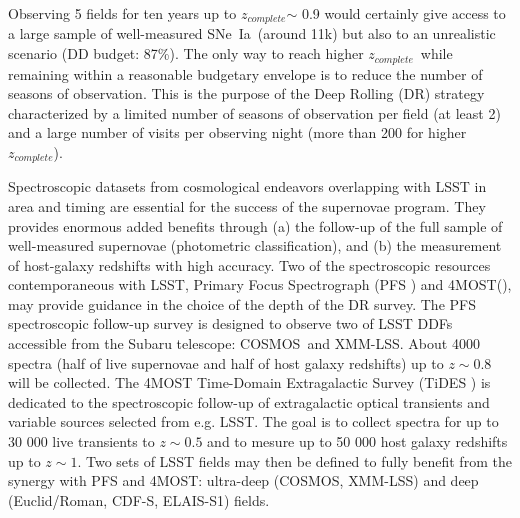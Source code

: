 \documentclass[skiphelvet,twocolumn]{aastex63}
\newcommand{\cosmos}{{COSMOS}}
\newcommand{\elais}{{ELAIS-S1}}
\newcommand{\xmm}{{XMM-LSS}}
\newcommand{\cdfs}{{CDF-S}}
\newcommand{\adfs}{{Euclid/Roman}}
\newcommand{\sne}{{SNe~Ia}}
\newcommand{\zcomp}{\mbox{$z_{complete}$}}
\begin{document}
Observing 5 fields for ten years up to \zcomp $\sim$ 0.9 would certainly give access to a large sample of well-measured \sne~(around 11k) but also to an unrealistic scenario (DD budget: 87\%). The only way to reach higher \zcomp~while remaining within a reasonable budgetary envelope is to reduce the number of seasons of observation. This is the purpose of the Deep Rolling (DR) strategy characterized by a limited number of seasons of observation per field (at least 2) and a large number of visits per observing night (more than 200 for higher \zcomp).
\par
Spectroscopic datasets from cosmological endeavors overlapping with LSST in area and timing are essential for the success of the supernovae program. They provides enormous added benefits through (a) the follow-up of the full sample of well-measured supernovae (photometric classification), and (b) the measurement of host-galaxy redshifts with high accuracy. Two of the spectroscopic resources contemporaneous with LSST, Primary Focus Spectrograph (PFS \cite{Tamura_2016}) and 4MOST(\cite{4MOST}), may provide guidance in the choice of the depth of the DR survey. The PFS spectroscopic follow-up survey is designed to observe two of LSST DDFs accessible from the Subaru telescope: \cosmos~and \xmm. About 4000 spectra (half of live supernovae and half of host galaxy redshifts) up to $z\sim0.8$ will be collected. The 4MOST Time-Domain Extragalactic Survey (TiDES \cite{TiDES}) is dedicated to the spectroscopic follow-up of extragalactic optical transients and variable sources selected from e.g. LSST. The goal is to collect spectra for up to 30 000 live transients to $z\sim0.5$ and to mesure up to 50 000 host galaxy redshifts up to $z\sim1$. Two sets of LSST fields may then be defined to fully benefit from the synergy with PFS and 4MOST: ultra-deep (\cosmos, \xmm) and deep (\adfs, \cdfs, \elais) fields.
\end{document}
